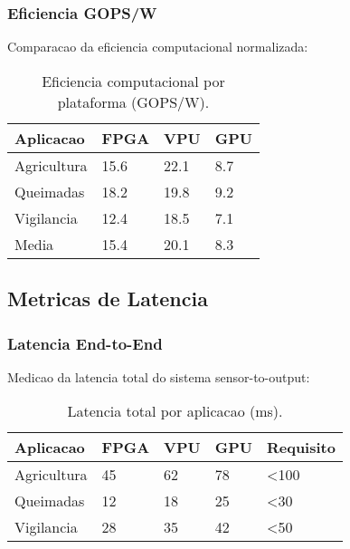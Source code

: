 \subsubsection{Eficiencia GOPS/W}
Comparacao da eficiencia computacional normalizada:

\begin{table}[!htp]
\caption[Eficiencia Computacional]{Eficiencia computacional por plataforma (GOPS/W).}
\label{tab:eficiencia_gops}
\begin{center}
\begin{tabular}{|p{3cm}|p{2cm}|p{2cm}|p{2cm}|}
\hline
\textbf{Aplicacao} & \textbf{FPGA} & \textbf{VPU} & \textbf{GPU} \\
\hline
Agricultura & 15.6 & 22.1 & 8.7 \\
\hline
Queimadas & 18.2 & 19.8 & 9.2 \\
\hline
Vigilancia & 12.4 & 18.5 & 7.1 \\
\hline
Media & 15.4 & 20.1 & 8.3 \\
\hline
\end{tabular}
\end{center}
\end{table}

\subsection{Metricas de Latencia}

\subsubsection{Latencia End-to-End}
Medicao da latencia total do sistema sensor-to-output:

\begin{table}[!htp]
\caption[Latencia por Aplicacao]{Latencia total por aplicacao (ms).}
\label{tab:latencia_aplicacao}
\begin{center}
\begin{tabular}{|p{3cm}|p{2cm}|p{2cm}|p{2cm}|p{2cm}|}
\hline
\textbf{Aplicacao} & \textbf{FPGA} & \textbf{VPU} & \textbf{GPU} & \textbf{Requisito} \\
\hline
Agricultura & 45 & 62 & 78 & <100 \\
\hline
Queimadas & 12 & 18 & 25 & <30 \\
\hline
Vigilancia & 28 & 35 & 42 & <50 \\
\hline
\end{tabular}
\end{center}
\end{table}


